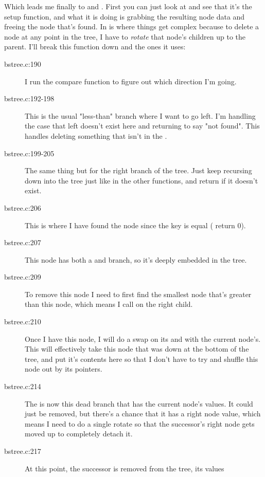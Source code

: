 Which leads me finally to  and .
First you can just look at  and see that it's the setup 
function, and what it is doing is grabbing the resulting node data and freeing
the node that's found.  In  is where things
get complex because to delete a node at any point in the tree, I have to
\emph{rotate} that node's children up to the parent.  I'll break this
function down and the ones it uses:

\begin{description}
\item[bstree.c:190] I run the compare function to figure out which direction I'm going.
\item[bstree.c:192-198] This is the usual "less-than" branch where I want to go left.
    I'm handling the case that left doesn't exist here and returning 
    to say "not found".  This handles deleting something that isn't in the 
    .
\item[bstree.c:199-205] The same thing but for the right branch of the tree.  Just keep
    recursing down into the tree just like in the other functions, and return
     if it doesn't exist.
\item[bstree.c:206] This is where I have found the node since the key is equal (
        return 0).
\item[bstree.c:207] This node has both a  and  branch, so it's
    deeply embedded in the tree.
\item[bstree.c:209] To remove this node I need to first find the smallest node that's
    greater than this node, which means I call  on
    the right child.
\item[bstree.c:210] Once I have this node, I will do a swap on its  and
     with the current node's.  This will effectively take this
    node that was down at the bottom of the tree, and put it's contents
    here so that I don't have to try and shuffle this node out by its
    pointers.
\item[bstree.c:214] The  is now this dead branch that has the current
    node's values.  It could just be removed, but there's a chance that it has
    a right node value, which means I need to do a single rotate so that
    the successor's right node gets moved up to completely detach it.
\item[bstree.c:217] At this point, the successor is removed from the tree, its values

\end{description}
